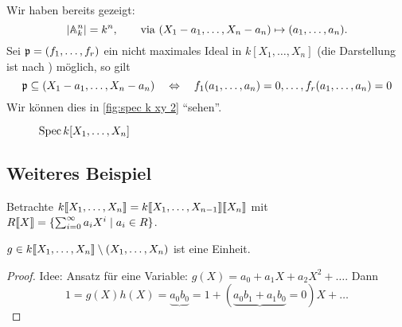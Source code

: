Wir haben bereits gezeigt:
\[
	|\mathbb{A}_k^n| = k^n, \qquad\text{via } 
		(X_1-a_1,\ldots,X_n-a_n) \mapsto (a_1,\ldots,a_n).
\]
Sei $\mathfrak{p} = (f_1, \ldots, f_r)$ ein nicht maximales Ideal in $k[X_1,\ldots,X_n]$
(die Darstellung ist nach ) möglich,
so gilt
\[
	\mathfrak{p} \subseteq (X_1 - a_1, \ldots, X_n - a_n)
	\quad\Leftrightarrow\quad
	f_1(a_1,\ldots,a_n) = 0, \ldots,
	f_r(a_1,\ldots,a_n) = 0
\]
Wir können dies in \autoref{fig:spec k xy 2} "`sehen"'.

\begin{figure}\centering
	\caption{$\operatorname{Spec} k[X_1,\ldots,X_n]$}
	\label{fig:spec k xy 2}
\end{figure}

\subsection{Weiteres Beispiel}
Betrachte $k\llbracket X_1, \ldots, X_n\rrbracket = 
	k\llbracket X_1,\ldots,X_{n-1}\rrbracket\llbracket X_n\rrbracket$
mit $R\llbracket  X\rrbracket = \{\sum_{i=0}^\infty a_i X^i \mid a_i \in R\}$.

\begin{bemerkung}
	$g \in k\llbracket  X_1, \ldots, X_n\rrbracket \setminus (X_1,\ldots,X_n)$
	ist eine Einheit.
\end{bemerkung}
\begin{proof}
	Idee: Ansatz für eine Variable:
	$g(X) = a_0 + a_1X + a_2X^2+ \ldots$. Dann
	\[
		1 = g(X)h(X) = 
		\underbrace{a_0 b_0}{= 1} + 
		(\underbrace{a_0b_1+a_1b_0}{= 0})X + \ldots
	\] 
\end{proof}

